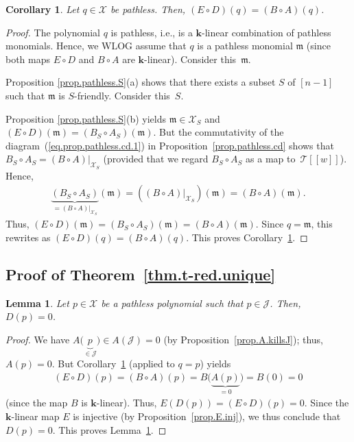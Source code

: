 \documentclass[pdftex]{sigma}
\newtheorem{Corollary}[Theorem]{Corollary}
\newtheorem{Lemma}[Theorem]{Lemma}
\numberwithin{equation}{section}
\begin{document}
\begin{Corollary}\label{cor.pathless.D}Let $q\in\mathcal{X}$ be pathless. Then, $( E\circ D ) (q) = ( B\circ A ) (q) $.
\end{Corollary}

\begin{proof}The polynomial $q$ is pathless, i.e., is a $\mathbf{k}$-linear combination of pathless monomials. Hence, we WLOG assume that $q$ is a pathless monomial $\mathfrak{m}$ (since both maps $E\circ D$ and $B\circ A$ are $\mathbf{k}$-linear). Consider this~$\mathfrak{m}$.

Proposition \ref{prop.pathless.S}(a) shows that there exists a subset $S$ of $[n-1] $ such that $\mathfrak{m}$ is $S$-friendly. Consider this~$S$.

Proposition \ref{prop.pathless.S}(b) yields $\mathfrak{m}\in\mathcal{X}_{S}$ and $(E\circ D) (\mathfrak{m}) = ( B_{S}\circ A_{S} ) (\mathfrak{m}) $. But the commutativity of the diagram~(\ref{eq.prop.pathless.cd.1}) in Proposition~\ref{prop.pathless.cd} shows that $B_{S}\circ A_{S}= ( B\circ A ) |_{\mathcal{X}_{S}}$ (provided that we regard $B_{S}\circ A_{S}$ as a map to~$\mathcal{T}[[w]] $). Hence,
\begin{gather*}
\underbrace{( B_{S}\circ A_{S}) }_{=( B\circ A)|_{\mathcal{X}_{S}}}(\mathfrak{m}) = (( B\circ A ) |_{\mathcal{X}_{S}} ) (\mathfrak{m}) = (B\circ A ) (\mathfrak{m}) .
\end{gather*}
Thus, $(E\circ D) (\mathfrak{m}) = ( B_{S}\circ A_{S}) (\mathfrak{m}) =( B\circ A ) (\mathfrak{m}) $. Since $q=\mathfrak{m}$, this rewrites as $(E\circ D) (q) = ( B\circ A ) (q) $. This proves Corollary~\ref{cor.pathless.D}.
\end{proof}

\subsection{Proof of Theorem~\ref{thm.t-red.unique}}

\begin{Lemma}\label{lem.t-red.unique.0}Let $p\in\mathcal{X}$ be a pathless polynomial such that $p\in\mathcal{J}$. Then, $D(p) =0$.
\end{Lemma}

\begin{proof}We have $A \big( \underbrace{p}_{\in\mathcal{J}} \big) \in A ( \mathcal{J} ) =0$ (by Proposition~\ref{prop.A.killsJ}); thus, $A(p) =0$. But Corollary~\ref{cor.pathless.D} (applied to $q=p$) yields
\begin{gather*}
(E\circ D) (p) =(B\circ A) (p) =B \Big( \underbrace{A(p) }_{=0} \Big) =B ( 0 ) =0
\end{gather*}
(since the map $B$ is $\mathbf{k}$-linear). Thus, $E ( D(p)) =(E\circ D) (p) =0$. Since the $\mathbf{k}$-linear map $E$ is injective (by Proposition~\ref{prop.E.inj}), we thus conclude that $D(p) =0$. This proves Lemma~\ref{lem.t-red.unique.0}.
\end{proof}
\end{document}
